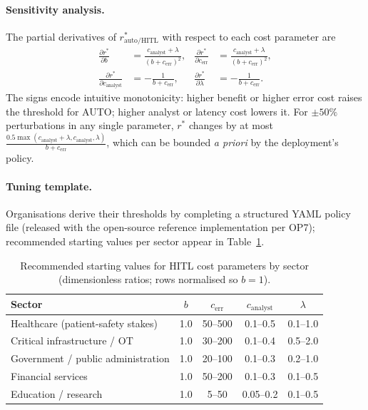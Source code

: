 \documentclass[preprint,12pt,authoryear]{elsarticle}
\begin{document}
\paragraph{Sensitivity analysis.}
The partial derivatives of $r^*_{\text{auto/HITL}}$ with respect to each cost parameter are
\begin{align}
\frac{\partial r^*}{\partial b} &= \frac{c_{\text{analyst}} + \lambda}{(b + c_{\text{err}})^2}, &
\frac{\partial r^*}{\partial c_{\text{err}}} &= \frac{c_{\text{analyst}} + \lambda}{(b + c_{\text{err}})^2}, \\
\frac{\partial r^*}{\partial c_{\text{analyst}}} &= - \frac{1}{b + c_{\text{err}}}, &
\frac{\partial r^*}{\partial \lambda} &= - \frac{1}{b + c_{\text{err}}}.
\end{align}
The signs encode intuitive monotonicity: higher benefit or higher error cost raises the threshold for AUTO; higher analyst or latency cost lowers it. For $\pm 50\%$ perturbations in any single parameter, $r^*$ changes by at most $\frac{0.5 \max(c_{\text{analyst}} + \lambda, c_{\text{analyst}}, \lambda)}{b + c_{\text{err}}}$, which can be bounded \emph{a priori} by the deployment's policy.

\paragraph{Tuning template.}
Organisations derive their thresholds by completing a structured YAML policy file (released with the open-source reference implementation per OP7); recommended starting values per sector appear in Table~\ref{tab:sectortuning}.

\begin{table}[H]
\centering
\caption{Recommended starting values for HITL cost parameters by sector (dimensionless ratios; rows normalised so $b = 1$).}
\label{tab:sectortuning}
\small
\begin{tabular}{lcccc}
\toprule
\textbf{Sector} & $b$ & $c_{\text{err}}$ & $c_{\text{analyst}}$ & $\lambda$ \\
\midrule
Healthcare (patient-safety stakes)              & 1.0 & 50--500   & 0.1--0.5 & 0.1--1.0 \\
Critical infrastructure / OT                     & 1.0 & 30--200   & 0.1--0.4 & 0.5--2.0 \\
Government / public administration              & 1.0 & 20--100   & 0.1--0.3 & 0.2--1.0 \\
Financial services                              & 1.0 & 50--200   & 0.1--0.3 & 0.1--0.5 \\
Education / research                            & 1.0 & 5--50     & 0.05--0.2 & 0.1--0.5 \\
\bottomrule
\end{tabular}
\end{table}
\end{document}
